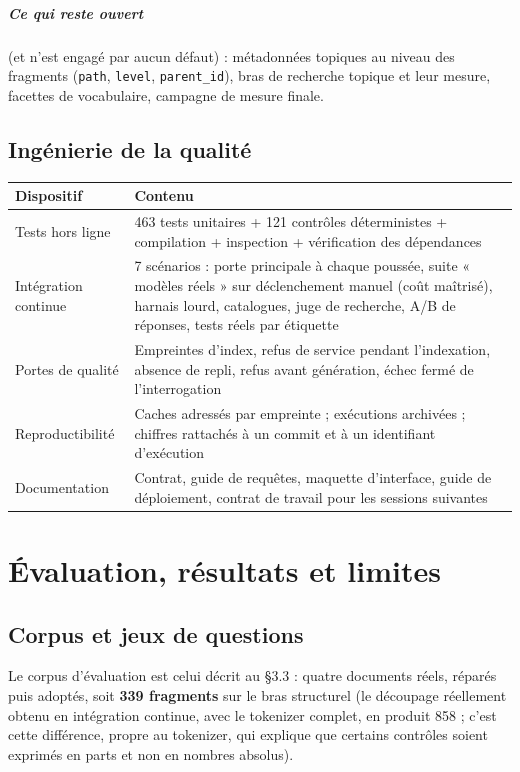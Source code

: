 \documentclass[a4paper,12pt]{report}
\begin{document}
\paragraph{Ce qui reste ouvert} (et n'est engagé par aucun défaut) : métadonnées topiques au niveau
des fragments (\texttt{path}, \texttt{level}, \texttt{parent\_id}), bras de recherche topique et
leur mesure, facettes de vocabulaire, campagne de mesure finale.

\section{Ingénierie de la qualité}
\begin{table}[H]
\centering
\small
\begin{tabular}{p{3.4cm}p{11.1cm}}
\toprule
\textbf{Dispositif} & \textbf{Contenu} \\
\midrule
Tests hors ligne & 463 tests unitaires + 121 contrôles déterministes + compilation + inspection +
vérification des dépendances \\
Intégration continue & 7 scénarios : porte principale à chaque poussée, suite « modèles réels » sur
déclenchement manuel (coût maîtrisé), harnais lourd, catalogues, juge de recherche, A/B de réponses,
tests réels par étiquette \\
Portes de qualité & Empreintes d'index, refus de service pendant l'indexation, absence de repli,
refus avant génération, échec fermé de l'interrogation \\
Reproductibilité & Caches adressés par empreinte ; exécutions archivées ; chiffres rattachés à un
commit et à un identifiant d'exécution \\
Documentation & Contrat, guide de requêtes, maquette d'interface, guide de déploiement, contrat de
travail pour les sessions suivantes \\
\bottomrule
\end{tabular}
\end{table}

\chapter{Évaluation, résultats et limites}

\section{Corpus et jeux de questions}
Le corpus d'évaluation est celui décrit au §3.3 : quatre documents réels, réparés puis adoptés,
soit \textbf{339 fragments} sur le bras structurel (le découpage réellement obtenu en intégration
continue, avec le tokenizer complet, en produit 858 ; c'est cette différence, propre au tokenizer,
qui explique que certains contrôles soient exprimés en parts et non en nombres absolus).
\end{document}
